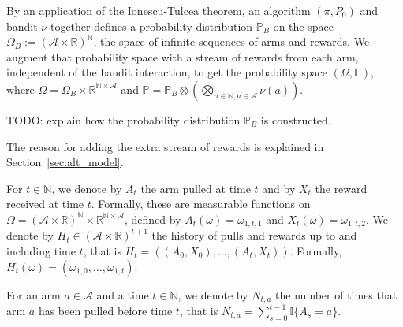 \begin{definition}\label{def:Bandit.measure}
  \leanok
By an application of the Ionescu-Tulcea theorem, an algorithm $(\pi, P_0)$ and bandit $\nu$ together defines a probability distribution $\mathbb{P}_B$ on the space $\Omega_B := (\mathcal{A} \times \mathbb{R})^{\mathbb{N}}$, the space of infinite sequences of arms and rewards.
We augment that probability space with a stream of rewards from each arm, independent of the bandit interaction, to get the probability space $(\Omega, \mathbb{P})$, where $\Omega = \Omega_B \times \mathbb{R}^{\mathbb{N} \times \mathcal{A}}$ and $\mathbb{P} = \mathbb{P}_B \otimes (\bigotimes_{n \in \mathbb{N}, a \in \mathcal{A}} \nu(a))$.

TODO: explain how the probability distribution $\mathbb{P}_B$ is constructed.
\end{definition}

The reason for adding the extra stream of rewards is explained in Section~\ref{sec:alt_model}.

\begin{definition}\label{def:armAndReward}
  \leanok
For $t \in \mathbb{N}$, we denote by $A_t$ the arm pulled at time $t$ and by $X_t$ the reward received at time $t$.
Formally, these are measurable functions on $\Omega = (\mathcal{A} \times \mathbb{R})^{\mathbb{N}} \times \mathbb{R}^{\mathbb{N} \times \mathcal{A}}$, defined by $A_t(\omega) = \omega_{1,t,1}$ and $X_t(\omega) = \omega_{1,t,2}$.
We denote by $H_t \in (\mathcal{A} \times \mathbb{R})^{t+1}$ the history of pulls and rewards up to and including time $t$, that is $H_t = ((A_0, X_0), \ldots, (A_t, X_t))$.
Formally, $H_t(\omega) = (\omega_{1,0}, \ldots, \omega_{1,t})$.
\end{definition}


\begin{definition}\label{def:pullCount}
  \leanok
For an arm $a \in \mathcal{A}$ and a time $t \in \mathbb{N}$, we denote by $N_{t,a}$ the number of times that arm $a$ has been pulled before time $t$, that is $N_{t,a} = \sum_{s=0}^{t-1} \mathbb{I}\{A_s = a\}$.
\end{definition}


